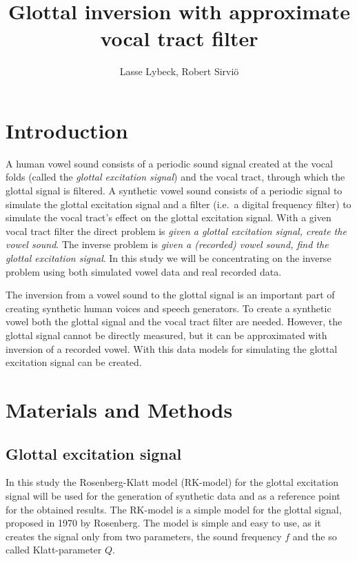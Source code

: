 \documentclass[12pt,a4]{article}
\title{Glottal inversion with approximate vocal tract filter}
\author{Lasse Lybeck, Robert Sirviö}
\begin{document}
\maketitle

\section{Introduction}
\label{sec:intro}

A human vowel sound consists of a periodic sound signal created at the vocal folds (called the \emph{glottal excitation signal}) and the vocal tract, through which the glottal signal is filtered. A synthetic vowel sound consists of a periodic signal to simulate the glottal excitation signal and a filter (i.e.\ a digital frequency filter) to simulate the vocal tract's effect on the glottal excitation signal.\cite{touda} With a given vocal tract filter the direct problem is \emph{given a glottal excitation signal, create the vowel sound}. The inverse problem is \emph{given a (recorded) vowel sound, find the glottal excitation signal}. In this study we will be concentrating on the inverse problem using both simulated vowel data and real recorded data.

The inversion from a vowel sound to the glottal signal is an important part of creating synthetic human voices and speech generators. To create a synthetic vowel both the glottal signal and the vocal tract filter are needed. However, the glottal signal cannot be directly measured, but it can be approximated with inversion of a recorded vowel. With this data models for simulating the glottal excitation signal can be created.

\newpage

\section{Materials and Methods}
\label{sec:methods}

\subsection{Glottal excitation signal}
\label{sec:rk}

In this study the Rosenberg-Klatt model (RK-model) for the glottal excitation signal will be used for the generation of synthetic data and as a reference point for the obtained results. The RK-model is a simple model for the glottal signal, proposed in 1970 by Rosenberg.\cite{rosenberg} The model is simple and easy to use, as it creates the signal only from two parameters, the sound frequency $f$ and the so called Klatt-parameter $Q$.
\end{document}
